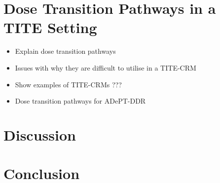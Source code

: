 
\section{Dose Transition Pathways in a TITE Setting}  
\label{section2.5}%

\begin{itemize}
	\item Explain dose transition pathways 
	\item Issues with why they are difficult to utilise in a TITE-CRM 
	\item Show examples of TITE-CRMs ???
	\item Dose transition pathways for ADePT-DDR 
\end{itemize}





\section{Discussion}  
\label{section2.6}%


\section{Conclusion}  
\label{section2.7}%
